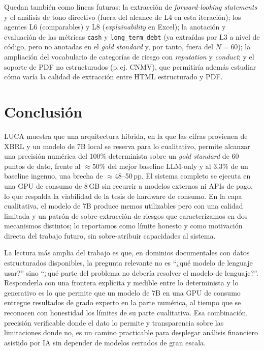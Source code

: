 \documentclass[conference]{IEEEtran}
\begin{document}
Quedan también como líneas futuras: la extracción de \textit{forward-looking
statements} y el análisis de tono directivo (fuera del alcance de L4 en esta
iteración); los agentes L6 (comparables) y L8 (\textit{explainability} en Excel);
la anotación y evaluación de las métricas \texttt{cash} y \texttt{long\_term\_debt}
(ya extraídas por L3 a nivel de código, pero no anotadas en el \textit{gold
standard} y, por tanto, fuera del $N=60$); la ampliación del vocabulario de
categorías de riesgo con \textit{reputation} y \textit{conduct}; y el soporte de
PDF no estructurados (p.\,ej. CNMV), que permitiría además estudiar cómo varía la
calidad de extracción entre HTML estructurado y PDF.

\section{Conclusión}
LUCA muestra que una arquitectura híbrida, en la que las cifras provienen de XBRL
y un modelo de 7B local se reserva para lo cualitativo, permite alcanzar una
precisión numérica del 100\% determinista sobre un \textit{gold standard} de 60
puntos de dato, frente al $\approx$50\% del mejor baseline LLM-only y al 3.3\% de
un baseline ingenuo, una brecha de $\approx$48--50\,pp. El sistema completo se
ejecuta en una GPU de consumo de 8\,GB sin recurrir a modelos externos ni APIs de
pago, lo que respalda la viabilidad de la tesis de hardware de consumo. En la capa
cualitativa, el modelo de 7B produce memos utilizables pero con una calidad
limitada y un patrón de sobre-extracción de riesgos que caracterizamos en dos
mecanismos distintos; lo reportamos como límite honesto y como motivación directa
del trabajo futuro, sin sobre-atribuir capacidades al sistema.

La lectura más amplia del trabajo es que, en dominios documentales con datos
estructurados disponibles, la pregunta relevante no es ``¿qué modelo de lenguaje
usar?'' sino ``¿qué parte del problema no debería resolver el modelo de
lenguaje?''. Responderla con una frontera explícita y medible entre lo
determinista y lo generativo es lo que permite que un modelo de 7B en una GPU de
consumo entregue resultados de grado experto en la parte numérica, al tiempo que
se reconocen con honestidad los límites de su parte cualitativa. Esa combinación,
precisión verificable donde el dato lo permite y transparencia sobre las
limitaciones donde no, es un camino practicable para desplegar análisis financiero
asistido por IA sin depender de modelos cerrados de gran escala.



\end{document}
